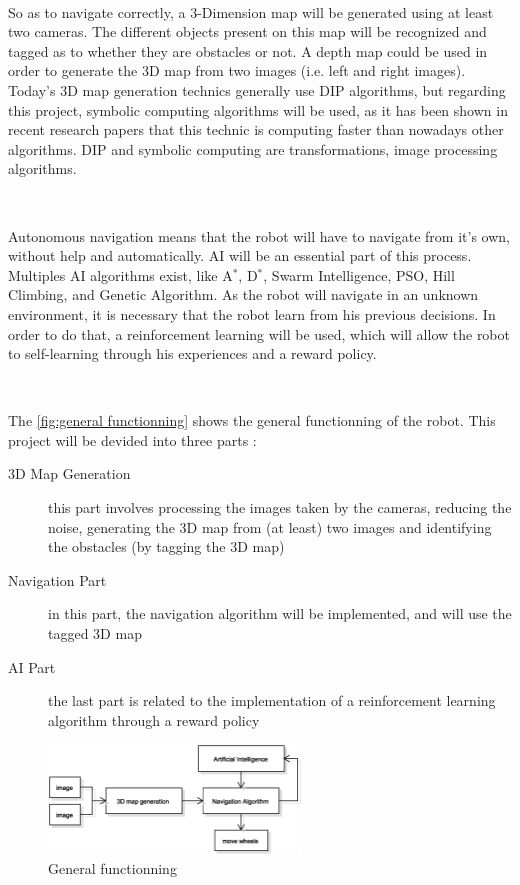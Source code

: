 ~~

So as to navigate correctly, a 3-Dimension map will be generated using at least two cameras. The different objects present on this map will be recognized and tagged as to whether they are obstacles or not. A depth map could be used in order to generate the 3D map from two images (i.e. left and right images). Today's 3D map generation technics generally use \gls{DIP} algorithms, but regarding this project, symbolic computing algorithms will be used, as it has been shown in recent research papers that this technic is computing faster than nowadays other algorithms. \Gls{DIP} and symbolic computing are transformations, \gls{image processing} algorithms. %

~~ 

Autonomous navigation means that the robot will have to navigate from it's own, without help and automatically. \gls{AI} will be an essential part of this process. Multiples \gls{AI} algorithms exist, like A$^*$, D$^*$, Swarm Intelligence, \gls{PSO}, Hill Climbing, and Genetic Algorithm. As the robot will navigate in an unknown environment, it is necessary that the robot learn from his previous decisions. In order to do that, a reinforcement learning will be used, which will allow the robot to self-learning through his experiences and a reward policy.  

~~

The \vref{fig:general functionning} shows the general functionning of the robot. This project will be devided into three parts : 
\begin{description}
	\item[3D Map Generation] this part involves processing the images taken by the cameras, reducing the noise, generating the 3D map from (at least) two images and identifying the obstacles (by tagging the 3D map)
	\item[Navigation Part] in this part, the navigation algorithm will be implemented, and will use the tagged 3D map
	\item[\gls{AI} Part] the last part is related to the implementation of a reinforcement learning algorithm through a reward policy
\end{description}


\begin{figure}[H]
	\centering
	\includegraphics[width=0.6\textwidth]{images/diagrams/flowchart_general}	
    \caption{General functionning}
    \label{fig:general functionning}
\end{figure}


